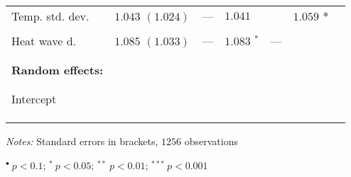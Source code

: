 \documentclass[a4paper,12pt]{article}
\begin{document}
{\begin{threeparttable}
\begin{footnotesize}
\begin{tabular}{lllllll}
          \vspace{-0.2cm}Temp. std. dev.&$1.043$ $(1.024)^{}$&---&$1.041$&&$1.059$ ${*}$&\\
  \\
          \vspace{-0.2cm}Heat wave d.&$1.085$ $(1.033)^{}$&---&$1.083$ $^{*}$&---&&\\
  \\
  \hline
\vspace{-0.2cm} \\
  \multicolumn{1}{l}{\textbf{Random effects:}}  & \\
\vspace{-0.2cm}
\\
\hline
\\
  \vspace{-0.2cm}Intercept\\
  \vspace{-0.1cm} \\ 
  \hline
  \vspace{-0.2cm} \\

\hline
\vspace{-0.2cm}
\end{tabular} 
\end{footnotesize}
 \begin{tablenotes}
  \begin{footnotesize}
    \item \textit{Notes:} Standard errors in brackets, \hspace{0.05cm}$1256$ observations
        \begin{adjustwidth}{1cm}{} 
    \item \hspace{0.45cm}$^{\bullet}~p<0.1$; $^{*}~p<0.05$; $^{**}~p<0.01$; $^{***}~p<0.001$
     \end{adjustwidth}
\singlespacing
  \end{footnotesize}
\end{tablenotes}
  \end{threeparttable} 
\par}
\linespread{1}

\pagebreak
\end{document}
